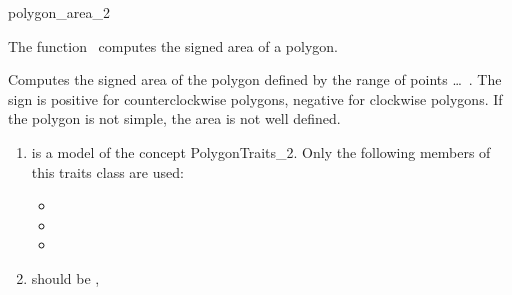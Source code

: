 

\begin{ccRefFunction}{polygon_area_2}  %


\ccDefinition
  
The function \ccRefName\ computes the signed area of a polygon.


{
Computes the signed area of the polygon defined by the range of points
 \ldots\ .
The sign is positive for counterclockwise polygons, negative for
clockwise polygons. If the polygon is not simple, the area is not well defined.
}

\begin{enumerate}
    \item {} is a model of the concept 
	  PolygonTraits\_2.
	  Only the following members of this traits class are used:
          \begin{itemize}
            \item {}
            \item {}
            \item {}
          \end{itemize}
    \item {} should be ,
\end{enumerate}

\ccSeeAlso

 \\
 \\
 \\


\end{ccRefFunction}


